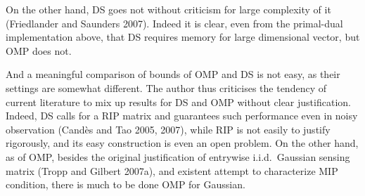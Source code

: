 On the other hand, DS goes not without criticism for large complexity of it (Friedlander and Saunders 2007).
Indeed it is clear, even from the primal-dual implementation above, that DS requires memory for large dimensional vector, but OMP does not.

And a meaningful comparison of bounds of OMP and DS is not easy, as their settings are somewhat different.
The author thus criticises the tendency of current literature to mix up results for DS and OMP without clear justification.
Indeed, DS calls for a RIP matrix and guarantees such performance even in noisy observation (Cand\`es and Tao 2005, 2007), while RIP is not easily to justify rigorously, and its easy construction is even an open problem.
On the other hand, as of OMP, besides the original justification of entrywise i.i.d.\ Gaussian sensing matrix (Tropp and Gilbert 2007a), and existent attempt to characterize MIP condition, there is much to be done OMP for Gaussian.
